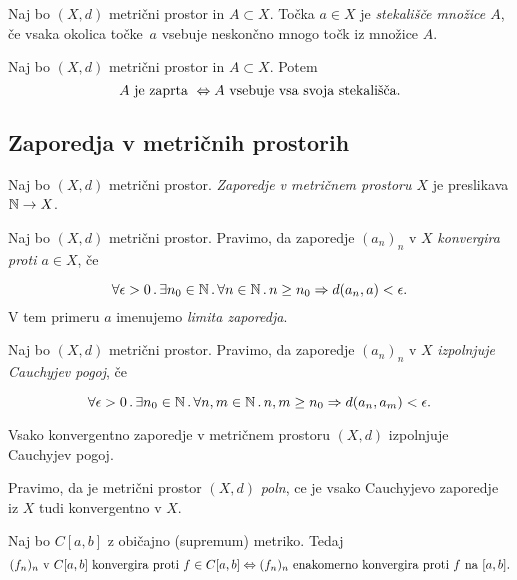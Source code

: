 \begin{definicija}
    Naj bo $(X, d)$ metrični prostor in $A \subset X$. Točka $a \in X$ je \emph{stekališče množice $A$}, če vsaka okolica točke~$a$ vsebuje neskončno mnogo točk iz množice $A$.
\end{definicija}

\begin{trditev}
    Naj bo $(X, d)$ metrični prostor in $A \subset X$. Potem 
    $$A \text{ je zaprta } \Leftrightarrow A \text{ vsebuje vsa svoja stekališča}.$$
\end{trditev}

\newpage
\subsection{Zaporedja v metričnih prostorih}
\begin{definicija}
    Naj bo $(X, d)$ metrični prostor. \emph{Zaporedje v metričnem prostoru $X$} je preslikava $\mathbb{N} \to X$.
\end{definicija}

\begin{definicija}
    Naj bo $(X, d)$ metrični prostor. Pravimo, da zaporedje $(a_n)_n$ v $X$ \emph{konvergira proti $a \in X$}, če

    $$\forall \epsilon > 0 \,.\, \exists n_0 \in \mathbb{N} \,.\, \forall n \in \mathbb{N} \,.\, n \geq n_0 \Rightarrow d(a_n, a) < \epsilon.$$
    V tem primeru $a$ imenujemo \emph{limita zaporedja}.
\end{definicija}

\begin{definicija}
    Naj bo $(X, d)$ metrični prostor. Pravimo, da zaporedje $(a_n)_n$ v $X$ \emph{izpolnjuje Cauchyjev pogoj}, če

    $$\forall \epsilon > 0 \,.\, \exists n_0 \in \mathbb{N} \,.\, \forall n, m \in \mathbb{N} \,.\, n, m \geq n_0 \Rightarrow d(a_n, a_m) < \epsilon.$$
\end{definicija}

\begin{izrek}
    Vsako konvergentno zaporedje v metričnem prostoru $(X, d)$ izpolnjuje Cauchyjev pogoj.
\end{izrek}

\begin{definicija}
    Pravimo, da je metrični prostor $(X, d)$ \emph{poln}, ce je vsako Cauchyjevo zaporedje iz $X$ tudi konvergentno v $X$.
\end{definicija}

\begin{izrek}
    Naj bo $C[a,b]$ z običajno (supremum) metriko. Tedaj 
    $$(f_n)_n \text{ v } C[a,b] \text{ konvergira proti } f \in C[a,b] \Leftrightarrow (f_n)_n \text{ enakomerno konvergira proti } f \text{ na } [a, b].$$
\end{izrek}

